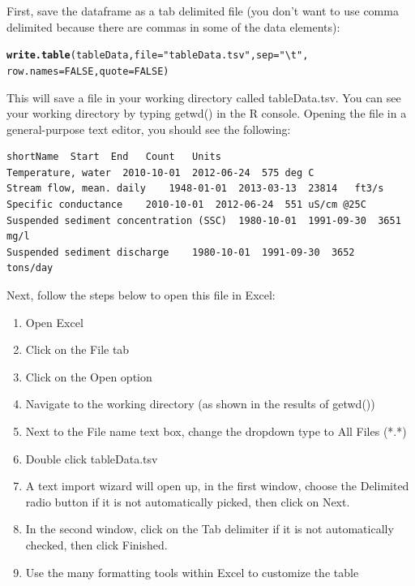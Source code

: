 \documentclass[a4paper,11pt]{article}\usepackage[]{graphicx}\usepackage[]{color}
\makeatletter
\newcommand{\hlnum}[1]{\textcolor[rgb]{0.686,0.059,0.569}{#1}}%
\newcommand{\hlstr}[1]{\textcolor[rgb]{0.192,0.494,0.8}{#1}}%
\newcommand{\hlstd}[1]{\textcolor[rgb]{0.345,0.345,0.345}{#1}}%
\newcommand{\hlkwc}[1]{\textcolor[rgb]{0.333,0.667,0.333}{#1}}%
\newcommand{\hlkwd}[1]{\textcolor[rgb]{0.737,0.353,0.396}{\textbf{#1}}}%
\newenvironment{kframe}{%
 \def\at@end@of@kframe{}%
 \ifinner\ifhmode%
  \def\at@end@of@kframe{\end{minipage}}%
  \begin{minipage}{\columnwidth}%
 \fi\fi%
 \def\FrameCommand##1{\hskip\@totalleftmargin \hskip-\fboxsep
 \colorbox{shadecolor}{##1}\hskip-\fboxsep
     \hskip-\linewidth \hskip-\@totalleftmargin \hskip\columnwidth}%
 \MakeFramed {\advance\hsize-\width
   \@totalleftmargin\z@ \linewidth\hsize
   \@setminipage}}%
 {\par\unskip\endMakeFramed%
 \at@end@of@kframe}
\newenvironment{knitrout}{}{} %
\makeatother
\begin{document}
First, save the dataframe as a tab delimited file (you don't want to use comma delimited because there are commas in some of the data elements):


\begin{knitrout}
\color{fgcolor}\begin{kframe}
\begin{alltt}
\hlkwd{write.table}\hlstd{(tableData,} \hlkwc{file}\hlstd{=}\hlstr{"tableData.tsv"}\hlstd{,}\hlkwc{sep}\hlstd{=}\hlstr{"\textbackslash{}t"}\hlstd{,}
            \hlkwc{row.names} \hlstd{=} \hlnum{FALSE}\hlstd{,}\hlkwc{quote}\hlstd{=}\hlnum{FALSE}\hlstd{)}
\end{alltt}
\end{kframe}
\end{knitrout}

This will save a file in your working directory called tableData.tsv.  You can see your working directory by typing getwd() in the R console. Opening the file in a general-purpose text editor, you should see the following:

\begin{verbatim}
shortName  Start  End	Count	Units
Temperature, water	2010-10-01	2012-06-24	575	deg C
Stream flow, mean. daily	1948-01-01	2013-03-13	23814	ft3/s
Specific conductance	2010-10-01	2012-06-24	551	uS/cm @25C
Suspended sediment concentration (SSC)	1980-10-01	1991-09-30	3651	mg/l
Suspended sediment discharge	1980-10-01	1991-09-30	3652	tons/day
\end{verbatim}

Next, follow the steps below to open this file in Excel:
\begin{enumerate}
\item Open Excel
\item Click on the File tab
\item Click on the Open option
\item Navigate to the working directory (as shown in the results of getwd())
\item Next to the File name text box, change the dropdown type to All Files (*.*)
\item Double click tableData.tsv
\item A text import wizard will open up, in the first window, choose the Delimited radio button if it is not automatically picked, then click on Next.
\item In the second window, click on the Tab delimiter if it is not automatically checked, then click Finished.
\item Use the many formatting tools within Excel to customize the table
\end{enumerate}
\end{document}
